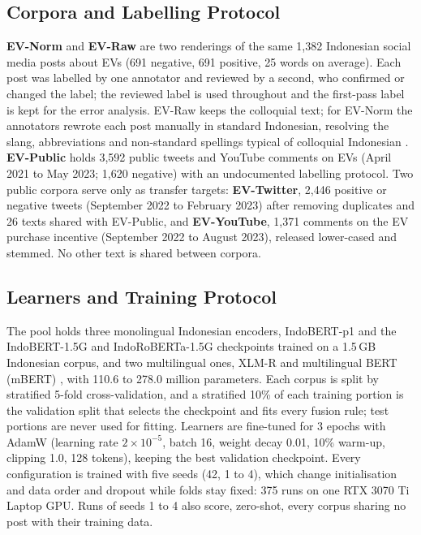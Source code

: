 \documentclass[conference,a4paper]{IEEEtran}
\begin{document}
\subsection{Corpora and Labelling Protocol}
\textbf{EV-Norm} and \textbf{EV-Raw} are two renderings of the same 1{,}382 Indonesian social media posts about EVs (691 negative, 691 positive, 25 words on average). Each post was labelled by one annotator and reviewed by a second, who confirmed or changed the label; the reviewed label is used throughout and the first-pass label is kept for the error analysis. EV-Raw keeps the colloquial text; for EV-Norm the annotators rewrote each post manually in standard Indonesian, resolving the slang, abbreviations and non-standard spellings typical of colloquial Indonesian \cite{wibowo2021}. \textbf{EV-Public} holds 3{,}592 public tweets and YouTube comments on EVs (April 2021 to May 2023; 1{,}620 negative) with an undocumented labelling protocol. Two public corpora serve only as transfer targets: \textbf{EV-Twitter}, 2{,}446 positive or negative tweets (September 2022 to February 2023) after removing duplicates and 26 texts shared with EV-Public, and \textbf{EV-YouTube}, 1{,}371 comments on the EV purchase incentive (September 2022 to August 2023), released lower-cased and stemmed. No other text is shared between corpora.

\subsection{Learners and Training Protocol}
The pool holds three monolingual Indonesian encoders, IndoBERT-p1 \cite{wilie2020} and the IndoBERT-1.5G and IndoRoBERTa-1.5G checkpoints trained on a 1.5\,GB Indonesian corpus, and two multilingual ones, XLM-R \cite{conneau2020} and multilingual BERT (mBERT) \cite{devlin2019}, with 110.6 to 278.0 million parameters. Each corpus is split by stratified 5-fold cross-validation, and a stratified 10\% of each training portion is the validation split that selects the checkpoint and fits every fusion rule; test portions are never used for fitting. Learners are fine-tuned for 3 epochs with AdamW (learning rate $2\times10^{-5}$, batch 16, weight decay 0.01, 10\% warm-up, clipping 1.0, 128 tokens), keeping the best validation checkpoint. Every configuration is trained with five seeds (42, 1 to 4), which change initialisation and data order \cite{sellam2022} and dropout \cite{bouthillier2021} while folds stay fixed: 375 runs on one RTX 3070 Ti Laptop GPU. Runs of seeds 1 to 4 also score, zero-shot, every corpus sharing no post with their training data.
\end{document}
